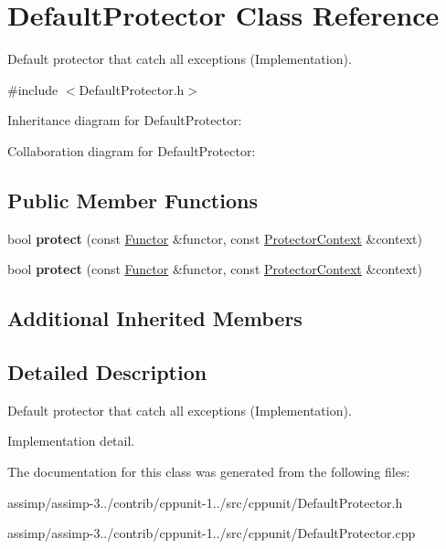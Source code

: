 \hypertarget{class_default_protector}{\section{Default\+Protector Class Reference}
\label{class_default_protector}
}


Default protector that catch all exceptions (Implementation).  




{\ttfamily \#include $<$Default\+Protector.\+h$>$}



Inheritance diagram for Default\+Protector\+:


Collaboration diagram for Default\+Protector\+:
\subsection*{Public Member Functions}
\begin{DoxyCompactItemize}
\item 
\hypertarget{class_default_protector_a640b04f86013017946bfe6de69f7131a}{bool {\bfseries protect} (const \hyperlink{class_functor}{Functor} \&functor, const \hyperlink{class_protector_context}{Protector\+Context} \&context)}\label{class_default_protector_a640b04f86013017946bfe6de69f7131a}

\item 
\hypertarget{class_default_protector_ac40c39b034df3f4cc3dba3bbd0364632}{bool {\bfseries protect} (const \hyperlink{class_functor}{Functor} \&functor, const \hyperlink{class_protector_context}{Protector\+Context} \&context)}\label{class_default_protector_ac40c39b034df3f4cc3dba3bbd0364632}

\end{DoxyCompactItemize}
\subsection*{Additional Inherited Members}


\subsection{Detailed Description}
Default protector that catch all exceptions (Implementation). 

Implementation detail. 

The documentation for this class was generated from the following files\+:\begin{DoxyCompactItemize}
\item 
assimp/assimp-\/3../contrib/cppunit-\/1../src/cppunit/Default\+Protector.\+h\item 
assimp/assimp-\/3../contrib/cppunit-\/1../src/cppunit/Default\+Protector.\+cpp\end{DoxyCompactItemize}
